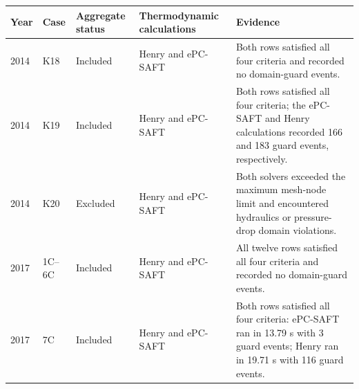\begin{center}
    \centering
    \small
    \label{tab:nccc-attempted-status}
    \renewcommand{\arraystretch}{1.15}
    \begin{tabularx}{\textwidth}{@{}ll>{\raggedright\arraybackslash}p{}>{\raggedright\arraybackslash}p{}>{\raggedright\arraybackslash}X@{}}
        \toprule
        \textbf{Year} & \textbf{Case} & \textbf{Aggregate status} & \textbf{Thermodynamic calculations} & \textbf{Evidence} \\
        \midrule
        2014 & K18 & Included & Henry and ePC-SAFT & Both rows satisfied all four criteria and recorded no domain-guard events. \\
        2014 & K19 & Included & Henry and ePC-SAFT & Both rows satisfied all four criteria; the ePC-SAFT and Henry calculations recorded 166 and 183 guard events, respectively. \\
        2014 & K20 & Excluded & Henry and ePC-SAFT & Both solvers exceeded the maximum mesh-node limit and encountered hydraulics or pressure-drop domain violations. \\
        2017 & 1C--6C & Included & Henry and ePC-SAFT & All twelve rows satisfied all four criteria and recorded no domain-guard events. \\
        2017 & 7C & Included & Henry and ePC-SAFT & Both rows satisfied all four criteria: ePC-SAFT ran in 13.79 s with 3 guard events; Henry ran in 19.71 s with 116 guard events. \\
        \bottomrule
    \end{tabularx}
\end{center}
